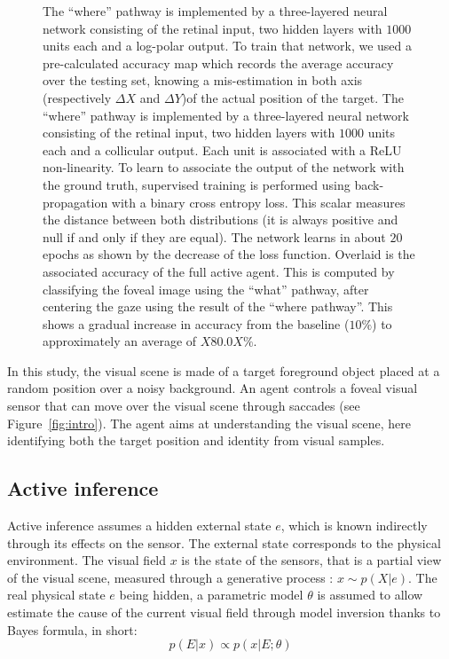 \begin{figure}[t!]
{\ICANN
\C The ``where'' pathway is implemented by a three-layered neural network consisting of the retinal input, two hidden layers with $1000$ units each and a log-polar output. To train that network, we used a pre-calculated accuracy map which records the average accuracy over the testing set, knowing a mis-estimation in both axis \ICANN
\else (respectively $\Delta X$ and  $\Delta Y$)\fi of the actual position of the target. %
\else
\C The ``where'' pathway is implemented by a three-layered neural network consisting of the retinal input, two hidden layers with $1000$ units each and a collicular output. Each unit is associated with a ReLU non-linearity. To learn to associate the output of the network with the ground truth, supervised training is performed using back-propagation with a binary cross entropy loss. This scalar measures the distance between both distributions (it is always positive and null if and only if they are equal). The network learns in about $20$ epochs as shown by the decrease of the loss function. Overlaid is the associated accuracy of the full active agent. This is computed by classifying the foveal image using the ``what'' pathway, after centering the gaze using the result of the ``where pathway''. This shows a gradual increase in accuracy from the baseline ($10\%$) to approximately an average of $X80.0X\%$. %
\fi
		\label{fig:methods}}%
\end{figure}%
In this study, the visual scene is made of a target foreground object placed at a random position over a noisy background. An agent controls a foveal visual sensor that can move over the visual scene through saccades (see Figure~\ref{fig:intro}). 
The agent aims at understanding the visual scene, here identifying both the target position and identity from visual samples.

\subsection{Active inference}
Active inference assumes a hidden external state $e$, which is known indirectly through its effects on the sensor. The external state  corresponds to the physical environment. The visual field $x$ is the state of the sensors, that is a partial view of the visual scene, measured through a generative process : $x\sim p(X|e)$. The real physical state $e$ being hidden, a parametric model $\theta$ is assumed to allow estimate the cause of the current visual field through model inversion thanks to Bayes formula, in short:
$$p(E|x) \propto p(x|E;\theta)$$


